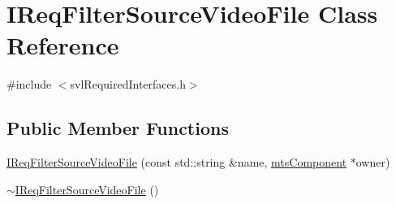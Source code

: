 \hypertarget{class_i_req_filter_source_video_file}{}\section{I\+Req\+Filter\+Source\+Video\+File Class Reference}
\label{class_i_req_filter_source_video_file}


{\ttfamily \#include $<$svl\+Required\+Interfaces.\+h$>$}

\subsection*{Public Member Functions}
\begin{DoxyCompactItemize}
\item 
\hyperlink{class_i_req_filter_source_video_file_ac256b74fd6ecd31d61a75a2b104f4b0c}{I\+Req\+Filter\+Source\+Video\+File} (const std\+::string \&name, \hyperlink{classmts_component}{mts\+Component} $\ast$owner)
\item 
\hyperlink{class_i_req_filter_source_video_file_a1ecff9695438fdf9123c4128f65ab106}{$\sim$\+I\+Req\+Filter\+Source\+Video\+File} ()
\end{DoxyCompactItemize}
